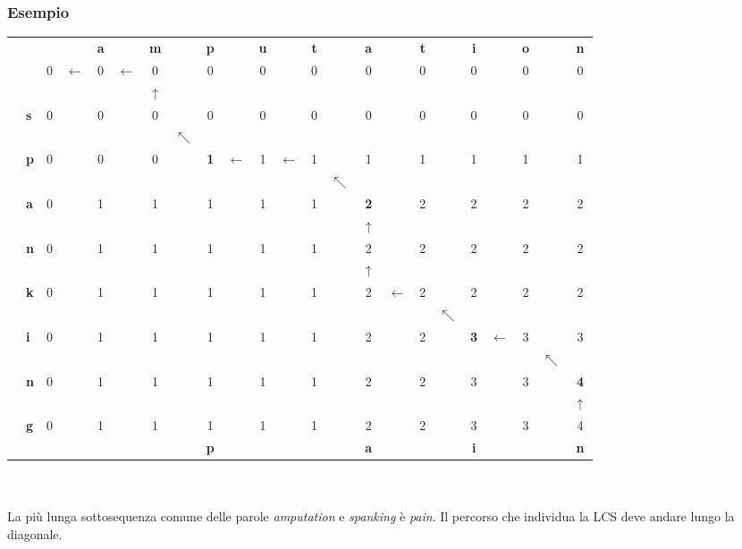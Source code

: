 \documentclass[10pt, a4paper]{report}
\begin{document}
\subsubsection{Esempio}
\begin{tabular}{cp{-5cm}cp{-5cm}cp{-5cm}cp{-5cm}cp{-5cm}cp{-5cm}cp{-5cm}cp{-5cm}cp{-5cm}cp{-5cm}cp{-5cm}c}
&&&&\textbf{a}&&\textbf{m}&&\textbf{p}&&\textbf{u}&&\textbf{t}&&\textbf{a}&&\textbf{t}&&\textbf{i}&&\textbf{o}&&\textbf{n}\\
&&0&$\leftarrow$&0&$\leftarrow$&0&&0&&0&&0&&0&&0&&0&&0&&0\\
&&&&&&$\uparrow$\\
&\textbf{s} &0&&0&&0&&0&&0&&0&&0&&0&&0&&0&&0\\
&&&&&&&$\nwarrow$\\
&\textbf{p} &0&&0&&0&&\textbf{1}&$\leftarrow$&1&$\leftarrow$&1&&1&&1&&1&&1&&1\\
&&&&&&&&&&&&&$\nwarrow$\\
&\textbf{a} &0&&1&&1&&1&&1&&1&&\textbf{2}&&2&&2&&2&&2\\
&&&&&&&&&&&&&&$\uparrow$\\
&\textbf{n} &0&&1&&1&&1&&1&&1&&2&&2&&2&&2&&2\\
&&&&&&&&&&&&&&$\uparrow$\\
&\textbf{k} &0&&1&&1&&1&&1&&1&&2&$\leftarrow$&2&&2&&2&&2\\
&&&&&&&&&&&&&&&&&$\nwarrow$\\
&\textbf{i} &0&&1&&1&&1&&1&&1&&2&&2&&\textbf{3}&$\leftarrow$&3&&3\\
&&&&&&&&&&&&&&&&&&&&&$\nwarrow$\\
&\textbf{n} &0&&1&&1&&1&&1&&1&&2&&2&&3&&3&&\textbf{4}\\
&&&&&&&&&&&&&&&&&&&&&&$\uparrow$\\
&\textbf{g} &0&&1&&1&&1&&1&&1&&2&&2&&3&&3&&4\\
&&&&&&&&\textbf{p}&&&&&&\textbf{a}&&&&\textbf{i}&&&&\textbf{n}
\end{tabular}
\\\\La più lunga sottosequenza comune delle parole \textsl{amputation} e\textsl{ spanking} è \textsl{pain}. Il percorso che individua la LCS deve andare lungo la diagonale.
\end{document}

